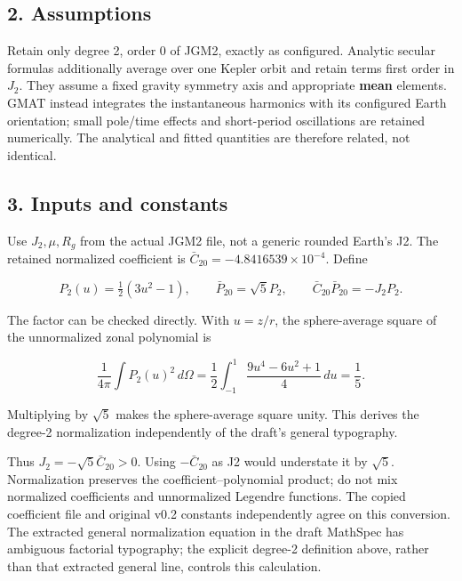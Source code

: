 \documentclass[10pt,a4paper]{article}
\numberwithin{equation}{section}
\begin{document}
\subsection*{2. Assumptions}
\begin{sloppypar}Retain only degree 2, order 0 of JGM2, exactly as configured. Analytic secular formulas additionally average over one Kepler orbit and retain terms first order in \(J_2\). They assume a fixed gravity symmetry axis and appropriate \textbf{mean} elements. GMAT instead integrates the instantaneous harmonics with its configured Earth orientation; small pole/time effects and short-period oscillations are retained numerically. The analytical and fitted quantities are therefore related, not identical.\end{sloppypar}


\subsection*{3. Inputs and constants}
\begin{sloppypar}Use \(J_2,\mu,R_g\) from the actual JGM2 file, not a generic rounded Earth's J2. The retained normalized coefficient is \(\bar C_{20}=-4.8416539\times10^{-4}\). Define\end{sloppypar}


\begin{equation}P_2(u)=\tfrac12(3u^2-1),\qquad
\bar P_{20}=\sqrt5 P_2,\qquad
\bar C_{20}\bar P_{20}=-J_2P_2.\label{eq:ch3-1}\end{equation}

\begin{sloppypar}The factor can be checked directly. With \(u=z/r\), the sphere-average square of the unnormalized zonal polynomial is\end{sloppypar}


\begin{equation}\frac1{4\pi}\int P_2(u)^2\,d\Omega
=\frac12\int_{-1}^{1}\frac{9u^4-6u^2+1}{4}\,du
=\frac15.\label{eq:ch3-2}\end{equation}

\begin{sloppypar}Multiplying by \(\sqrt5\) makes the sphere-average square unity. This derives the degree-2 normalization independently of the draft's general typography.\end{sloppypar}


\begin{sloppypar}Thus \(J_2=-\sqrt5\bar C_{20}>0\). Using \(-\bar C_{20}\) as J2 would understate it by \(\sqrt5\). Normalization preserves the coefficient--polynomial product; do not mix normalized coefficients and unnormalized Legendre functions. The copied coefficient file and original v0.2 constants independently agree on this conversion. The extracted general normalization equation in the draft MathSpec has ambiguous factorial typography; the explicit degree-2 definition above, rather than that extracted general line, controls this calculation.\end{sloppypar}
\end{document}
